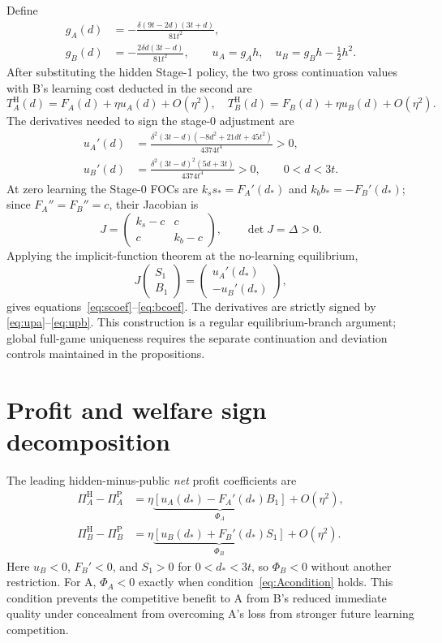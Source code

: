 \documentclass[11pt,a4paper]{article}
\numberwithin{equation}{section}
\theoremstyle{remark}
\newcommand{\PP}{\mathrm{P}}
\newcommand{\HH}{\mathrm{H}}
\begin{document}
Define
\begin{align}
g_A(d)&=-\frac{\delta(9t-2d)(3t+d)}{81t^2},\nonumber\\
g_B(d)&=-\frac{2\delta d(3t-d)}{81t^2},\qquad
u_A=g_Ah,\quad u_B=g_Bh-\tfrac12h^2.
\label{eq:ug}
\end{align}
After substituting the hidden Stage-1 policy, the two gross continuation values with B's learning cost deducted in the second are
\[
T_A^{\HH}(d)=F_A(d)+\eta u_A(d)+O(\eta^2),
\quad
T_B^{\HH}(d)=F_B(d)+\eta u_B(d)+O(\eta^2).
\]
The derivatives needed to sign the stage-0 adjustment are
\begin{align}
u_A'(d)&=
\frac{\delta^2(3t-d)(-8d^2+21dt+45t^2)}
{4374t^4}>0,\label{eq:upa}\\
u_B'(d)&=
\frac{\delta^2(3t-d)^2(5d+3t)}
{4374t^4}>0,\qquad 0<d<3t.\label{eq:upb}
\end{align}
At zero learning the Stage-0 FOCs are $k_s s_*=F_A'(d_*)$ and $k_b b_*=-F_B'(d_*)$; since $F_A''=F_B''=c$, their Jacobian is
\[
J=\begin{pmatrix}k_s-c&c\\c&k_b-c\end{pmatrix},
\qquad \det J=\Delta>0.
\]
Applying the implicit-function theorem at the no-learning equilibrium,
\[
J\begin{pmatrix}S_1\\B_1\end{pmatrix}=
\begin{pmatrix}u_A'(d_*)\\-u_B'(d_*)\end{pmatrix},
\]
gives equations~\eqref{eq:scoef}--\eqref{eq:bcoef}. The derivatives are strictly signed by \eqref{eq:upa}--\eqref{eq:upb}. This construction is a regular equilibrium-branch argument; global full-game uniqueness requires the separate continuation and deviation controls maintained in the propositions.

\section{Profit and welfare sign decomposition}\label{app:welfare}

The leading hidden-minus-public \emph{net} profit coefficients are
\begin{align}
\Pi_A^{\HH}-\Pi_A^{\PP}
 &=\eta\underbrace{\left[u_A(d_*)-F_A'(d_*)B_1\right]}_{\Phi_A}
  +O(\eta^2),\label{eq:pacoef}\\
\Pi_B^{\HH}-\Pi_B^{\PP}
 &=\eta\underbrace{\left[u_B(d_*)+F_B'(d_*)S_1\right]}_{\Phi_B}
  +O(\eta^2).\label{eq:pbcoef}
\end{align}
Here $u_B<0$, $F_B'<0$, and $S_1>0$ for $0<d_*<3t$, so $\Phi_B<0$ without another restriction. For A, $\Phi_A<0$ exactly when condition~\eqref{eq:Acondition} holds. This condition prevents the competitive benefit to A from B's reduced immediate quality under concealment from overcoming A's loss from stronger future learning competition.
\end{document}
